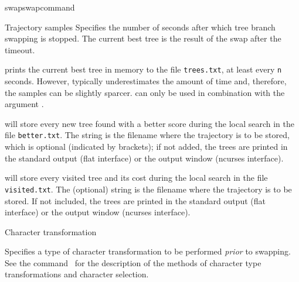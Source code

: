 \begin{command}{swap}{swapcommand}
\begin{arguments}
\begin{argumentgroup}{Trajectory samples}
            {Specifies the number of seconds after which tree branch
            swapping is stopped. The current best tree is the result of the
            swap after the timeout.} 
            {}

	{ prints the current
            best tree in memory to the file \texttt{trees.txt}, at least every 
            \texttt{n} seconds. However, \poy typically underestimates the amount of
            time and, therefore, the samples can be slightly sparcer.  
            can only be used in combination with the argument .}
            {}

			{ will store every new tree
                found with a better score during the local search in the file
                \texttt{better.txt}. The string is the filename where the
                trajectory is to be stored, which is optional (indicated by
                brackets); if not added, the trees are printed in the standard
                output (flat interface) or the output window (ncurses
                interface).}
            {} 

            { will store every visited tree
            and its cost during the local search in the file
            \texttt{visited.txt}. The (optional) string is the filename where the
            trajectory is to be stored. If not included, the trees are printed
            in the standard output (flat interface) or the output window (ncurses
            interface).}
            {}
    
    \end{argumentgroup}

    \begin{argumentgroup}{Character transformation}
    	{}
	
            {Specifies a type of character transformation to be performed
            \emph{prior} to swapping.
            See the command~ for
            the description of the methods of character type transformations
            and character selection.}
            {}
    \end{argumentgroup}
            

\end{arguments}
\end{command}
